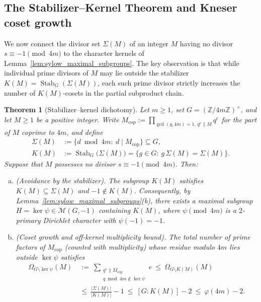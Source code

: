 \documentclass[11pt, a4paper]{article}
\theoremstyle{plain}
\newtheorem{theorem}{Theorem}[section]
\theoremstyle{definition}
\newcommand{\Z}{\mathbb{Z}}
\begin{document}
\subsection{The Stabilizer--Kernel Theorem and Kneser coset growth}\label{subsec:stabilizer_kernel_thm}

We now connect the divisor set $\Sigma(M)$ of an integer $M$ having no divisor $s\equiv-1\pmod{4m}$ to the character kernels of Lemma~\ref{lem:sylow_maximal_subgroups}. The key observation is that while individual prime divisors of $M$ may lie outside the stabilizer $K(M)=\operatorname{Stab}_G(\Sigma(M))$, each such prime divisor strictly increases the number of $K(M)$-cosets in the partial subproduct chain.

\begin{theorem}[Stabilizer--kernel dichotomy]\label{thm:stabilizer_kernel_dichotomy}
Let $m\ge1$, set $G=(\Z/4m\Z)^{\times}$, and let $M\ge1$ be a positive integer. Write $M_{\mathrm{cop}}:=\prod_{\gcd(q,4m)=1,\,q^{e}\parallel M}q^{e}$ for the part of $M$ coprime to $4m$, and define
\[
\begin{aligned}
\Sigma(M)&:=\big\{d\bmod 4m:\ d\mid M_{\mathrm{cop}}\big\}\subseteq G,\\
K(M)&:=\operatorname{Stab}_G\big(\Sigma(M)\big)=\big\{g\in G:\ g\,\Sigma(M)=\Sigma(M)\big\}.
\end{aligned}
\]
Suppose that $M$ possesses no divisor $s\equiv-1\pmod{4m}$. Then:
\begin{enumerate}[(a)]
    \item \emph{(Avoidance by the stabilizer).} The subgroup $K(M)$ satisfies $K(M)\subseteq\Sigma(M)$ and $-1\notin K(M)$. Consequently, by Lemma~\ref{lem:sylow_maximal_subgroups}(b), there exists a maximal subgroup $H=\ker\psi\in\mathcal{M}(G,-1)$ containing $K(M)$, where $\psi\pmod{4m}$ is a $2$-primary Dirichlet character with $\psi(-1)=-1$.
    \item \emph{(Coset growth and off-kernel multiplicity bound).} The total number of prime factors of $M_{\mathrm{cop}}$ (counted with multiplicity) whose residue modulo $4m$ lies outside $\ker\psi$ satisfies
    \begin{equation}\label{eq:omega_outside_kernel_bound}
    \begin{split}
    \Omega_{G\setminus\ker\psi}(M)\ &:=\ \sum_{\substack{q^{e}\parallel M_{\mathrm{cop}}\\ q\bmod 4m\notin\ker\psi}}e\ \le\ \Omega_{G\setminus K(M)}(M)\\
    &\le\ \frac{|\Sigma(M)|}{|K(M)|}-1\ \le\ [G:K(M)]-2\ \le\ \varphi(4m)-2.

\end{split}
\end{equation}
\end{enumerate}
\end{theorem}
\end{document}
